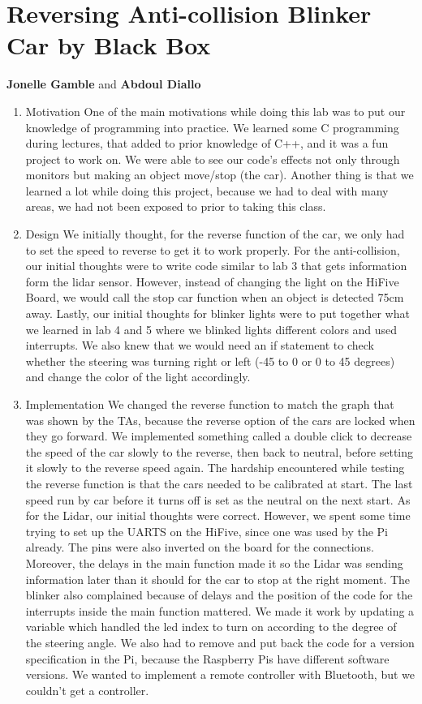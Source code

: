 \documentclass[11pt]{article}
\begin{document}
\section{Reversing Anti-collision Blinker Car by Black Box}
\label{sec:org6807d00}
\textbf{Jonelle Gamble} and \textbf{Abdoul Diallo}

\begin{enumerate}
\item Motivation
\label{sec:org3f5c129}
One of the main motivations while doing this lab was to put our
knowledge of programming into practice. We learned some C programming
during lectures, that added to prior knowledge of C++, and it was a
fun project to work on. We were able to see our code’s effects not
only through monitors but making an object move/stop (the
car). Another thing is that we learned a lot while doing this project,
because we had to deal with many areas, we had not been exposed to
prior to taking this class.

\item Design
\label{sec:org546d5ac}
We initially thought, for the reverse function of the car, we only
had to set the speed to reverse to get it to work properly. For the
anti-collision, our initial thoughts were to write code similar to
lab 3 that gets information form the lidar sensor. However, instead
of changing the light on the HiFive Board, we would call the stop
car function when an object is detected 75cm away. Lastly, our
initial thoughts for blinker lights were to put together what we
learned in lab 4 and 5 where we blinked lights different colors and
used interrupts. We also knew that we would need an if statement to
check whether the steering was turning right or left (-45 to 0 or 0
to 45 degrees) and change the color of the light accordingly.

\item Implementation
\label{sec:org4d92b5e}
We changed the reverse function to match the graph that was shown
by the TAs, because the reverse option of the cars are locked when
they go forward. We implemented something called a double click to
decrease the speed of the car slowly to the reverse, then back to
neutral, before setting it slowly to the reverse speed again. The
hardship encountered while testing the reverse function is that the
cars needed to be calibrated at start. The last speed run by car
before it turns off is set as the neutral on the next start. As for
the Lidar, our initial thoughts were correct. However, we spent
some time trying to set up the UARTS on the HiFive, since one was
used by the Pi already. The pins were also inverted on the board
for the connections. Moreover, the delays in the main function made
it so the Lidar was sending information later than it should for
the car to stop at the right moment. The blinker also complained
because of delays and the position of the code for the interrupts
inside the main function mattered. We made it work by updating a
variable which handled the led index to turn on according to the
degree of the steering angle. We also had to remove and put back
the code for a version specification in the Pi, because the
Raspberry Pis have different software versions. We wanted to
implement a remote controller with Bluetooth, but we couldn’t get a
controller.


\end{enumerate}
\end{document}
